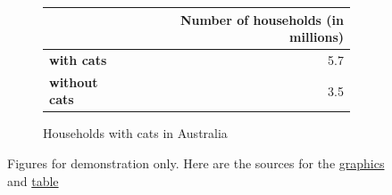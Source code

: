\begin{figure}[ht!]
  \begin{subfigure}[c]{\textwidth}
  \centering
    \begin{tabulary}{\columnwidth}{lr}
    \toprule
        & \textbf{Number of households (in millions)}  \\
    \hline
        \textbf{with cats} & 5.7 \\
        \textbf{without cats} & 3.5  \\
    \bottomrule
    \end{tabulary}
    \caption{Households with cats in Australia}
    \label{tab:cats}
  \end{subfigure}\hfill
  \vspace{0.2cm}
  
  \caption{Figures for demonstration only. Here are the sources for the \href{https://visme.co/blog/funny-graphs/}{graphics} and \href{https://www.vetvoice.com.au/ec/pet-ownership/pet-ownership-statistics/}{table}}
  \label{fig:demo}
\end{figure}
